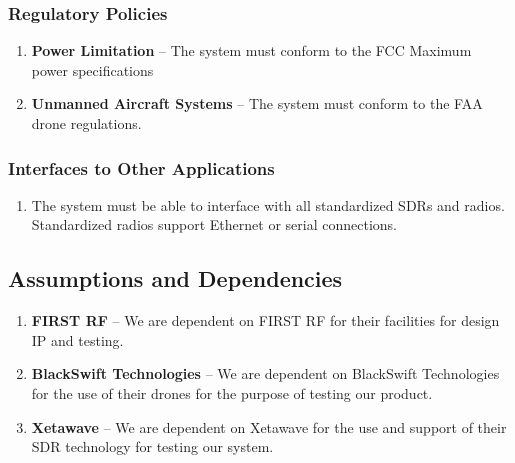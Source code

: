\documentclass[ProjectRequirements.tex]{subfiles}
\begin{document}
		\subsubsection{Regulatory Policies}
			\begin{enumerate}
				\item \textbf{Power Limitation} -- The system must conform to the FCC Maximum power specifications
				\item \textbf{Unmanned Aircraft Systems} -- The system must conform to the FAA drone regulations.
			\end{enumerate}
		\subsubsection{Interfaces to Other Applications}
			\begin{enumerate}
				\item The system must be able to interface with all standardized SDRs and radios.  Standardized radios support Ethernet or serial connections.
				
			\end{enumerate}

		
	\subsection{Assumptions and Dependencies}
		\begin{enumerate}
				\item \textbf{FIRST RF} -- We are dependent on FIRST RF for their facilities for design IP and testing.  
				\item \textbf{BlackSwift Technologies} -- We are dependent on BlackSwift Technologies for the use of their drones for the purpose of testing our product.  
				\item \textbf{Xetawave} -- We are dependent on Xetawave for the use and support of their SDR technology for testing our system.
		\end{enumerate}
\end{document}
